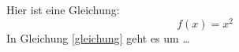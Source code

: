 Hier ist eine Gleichung:
\begin{equation}\label{gleichung}
  f(x)=x^2
\end{equation}
In Gleichung \eqref{gleichung}
geht es um \dots

